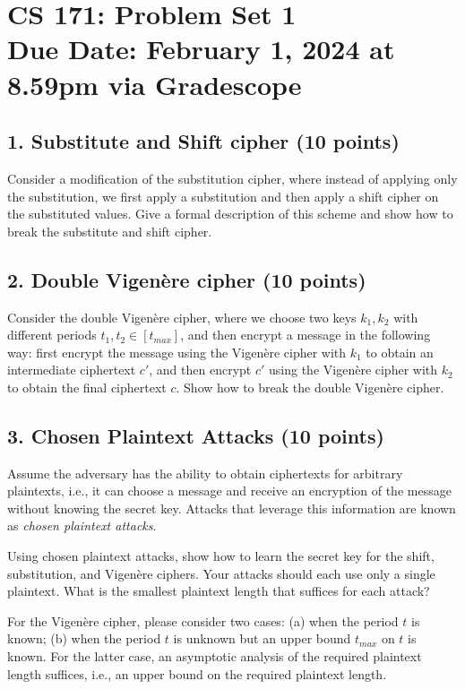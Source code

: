 \documentclass[11pt]{article}
\newcommand{\duedate}{February 1, 2024 at 8.59pm via Gradescope}
\begin{document}
\section*{CS 171: Problem Set 1\\ {\small Due Date: \duedate} }

\subsection*{1. Substitute and Shift cipher (10 points)}
Consider a modification of the substitution cipher, where instead of applying only the substitution, we first apply a substitution and then apply a shift cipher on the substituted values. Give a formal description of this scheme and show how to break the substitute and shift cipher.

\subsection*{2. Double Vigen\`{e}re cipher (10 points)}
Consider the double Vigen\`{e}re cipher, where we choose two keys $k_1, k_2$ with different periods $t_1,t_2 \in [t_{max}]$, and then encrypt a message in the following way: first encrypt the message using the Vigen\`{e}re cipher with $k_1$ to obtain an intermediate ciphertext $c'$, and then encrypt $c'$ using the Vigen\`{e}re cipher with $k_2$ to obtain the final ciphertext $c$.
Show how to break the double Vigen\`{e}re cipher.

\subsection*{3. Chosen Plaintext Attacks (10 points)}
Assume the adversary has the ability to obtain ciphertexts for arbitrary plaintexts, i.e., it can choose a message and receive an encryption of the message without knowing the secret key.
Attacks that leverage this information are known as \textit{chosen plaintext attacks}.
\medskip

\noindent Using chosen plaintext attacks, show how to learn the secret key for the shift, substitution, and Vigen\`{e}re ciphers. Your attacks should each use only a single plaintext. What is the smallest plaintext length that suffices for each attack?
\medskip

\noindent For the Vigen\`{e}re cipher, please consider two cases: (a) when the period $t$ is known; (b) when the period $t$ is unknown but an upper bound $t_{max}$ on $t$ is known. For the latter case, an asymptotic analysis of the required plaintext length suffices, i.e., an upper bound on the required plaintext length.
\end{document}
